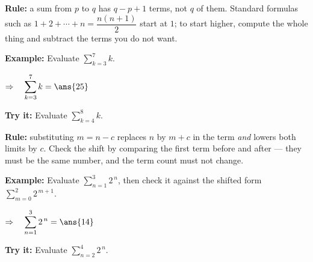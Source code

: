 \documentclass[12pt]{article}
\begin{document}


\begin{formulabox}
\textbf{Rule:} a sum from $p$ to $q$ has $q - p + 1$ terms, not $q$ of them. Standard formulas
such as $1 + 2 + \cdots + n = \dfrac{n(n+1)}{2}$ start at $1$; to start higher, compute the
whole thing and subtract the terms you do not want.
\end{formulabox}

\begin{examplebox}
\textbf{Example:} \quad Evaluate $\displaystyle\sum_{k=3}^{7} k$.

$\Rightarrow\quad \displaystyle\sum_{k=3}^{7} k = \ans{25}$
\end{examplebox}

\begin{tryitbox}
\textbf{Try it:} \quad Evaluate $\displaystyle\sum_{k=4}^{8} k$.\\[2pt]
\end{tryitbox}


\begin{formulabox}
\textbf{Rule:} substituting $m = n - c$ replaces $n$ by $m + c$ in the term \emph{and} lowers
both limits by $c$. Check the shift by comparing the first term before and after --- they must
be the same number, and the term count must not change.
\end{formulabox}

\begin{examplebox}
\textbf{Example:} \quad Evaluate $\displaystyle\sum_{n=1}^{3} 2^{\,n}$, then check it against the shifted form $\displaystyle\sum_{m=0}^{2} 2^{\,m+1}$.

$\Rightarrow\quad \displaystyle\sum_{n=1}^{3} 2^{\,n} = \ans{14}$
\end{examplebox}

\begin{tryitbox}
\textbf{Try it:} \quad Evaluate $\displaystyle\sum_{n=2}^{4} 2^{\,n}$.\\[2pt]
\end{tryitbox}
\end{document}
